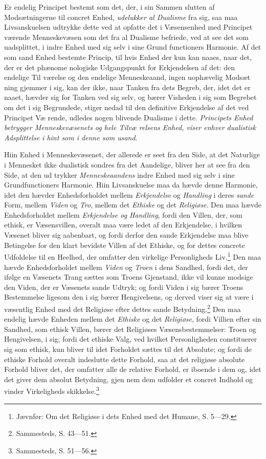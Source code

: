 Er endelig Principet bestemt som det, der, i sin Sammen\-%
slutten af Modsætningerne til concret Enhed, \emph{udelukker al
Dualisme} fra sig, saa maa Livsanskuelsen udtrykke dette
ved at opfatte det i Væsensenhed med Principet værende
Menneskevæsen som det fra al Dualisme befriede, ved at see
det som uadsplittet, i indre Enhed med sig selv i sine Grund\-%
functioners Harmonie. Af det som sand Enhed bestemte Princip,
til hvis Enhed der kun kan naaes, naar det, der er det phænome\-%
nologiske Udgangspunkt for Erkjendelsen af det: den endelige Til\-%
værelse og den endelige Menneskeaand, ingen uophævelig Modsæt\-%
ning gjemmer i sig, kan der ikke, naar Tanken fra dets Begreb,
der, idet det er naaet, hævder sig for Tanken ved sig selv, og bærer
Visheden i sig som Begrebet om det i sig Begrundede, stiger
nedad til den definitive Erkjendelse af det ved Principet Væ\-%
rende, udledes nogen blivende Dualisme i dette. \emph{Principets
Enhed betrygger Menneskevæsenets og hele Tilvæ\-%
relsens Enhed, viser enhver dualistisk Adsplittelse
i hint som i denne som usand}.
 \setcounter{footnote}{0}%

Hiin Enhed i Menneskevæsenet, der allerede er seet fra
den Side, at det Naturlige i Mennesket ikke dualistisk sondres
fra det Aandelige, bliver her at see fra den Side, at den ud\-%
trykker \emph{Menneskeaandens} indre Enhed med sig selv i sine
Grundfunctioners Harmonie. Hiin Livsanskuelse maa da hævde
denne Harmonie, idet den hævder Enhedsforholdet mellem
\emph{Erkjendelse} og \emph{Handling} i deres \emph{sande} Form, mellem
\emph{Viden} og \emph{Tro}, mellem det \emph{Ethiske} og det \emph{Religiøse}.
Den maa hævde Enhedsforholdet mellem \emph{Erkjendelse og
Handling}, fordi den Villen, der, som ethisk, er Væsensvillen,
overalt maa være ledet af den Erkjendelse, i hvilken Væsenet
bliver sig aabenbart, og fordi derfor den sande Erkjendelse
maa blive Betingelse for den klart bevidste Villen af det
Ethiske, og for dettes concrete Udfoldelse til en Heelhed, der
omfatter den virkelige Personligheds Liv.\footnote{Jævnfør: Om det Religiøse i dets Enhed med det Humane, S. 5---29.} Den maa hævde
Enhedsforholdet mellem \emph{Viden} og \emph{Troen} i dens Sandhed,
fordi det, der ifølge en Væsenets Trang sættes som Troens
Gjenstand, ikke vil kunne modsige den Viden, der er Væsenets
sande Udtryk; og fordi Viden i sig bærer Troens Bestemmelse
ligesom den i sig bærer Hengivelsens, og derved viser sig at
være i væsentlig Enhed med det Religiøse efter dettes sande
Betydning.\footnote{Sammesteds, S. 43---51.} Den maa endelig hævde Enheden mellem det
\emph{Ethiske} og det \emph{Religiøse}, fordi Villien efter sin Sandhed,
som ethisk Villen, bærer det Religiøses Væsensbestemmelser:
Troen og Hengivelsen, i sig; fordi det ethiske Valg, ved hvilket
Personligheden constituerer sig som ethisk, kun bliver til idet
Forholdet sættes til det Absolute; og fordi de ethiske Forhold
overalt indeslutte dette Forhold, saa at det religiøse absolute
Forhold bliver det, der omfatter alle de relative Forhold, er
iboende i dem og, idet det giver dem absolut Betydning, gjen\-%
\setcounter{footnote}{0}%
nem dem udfolder et concret Indhold og vinder Virkeligheds\-%
skikkelse.\footnote{Sammesteds, S. 51---56.}

